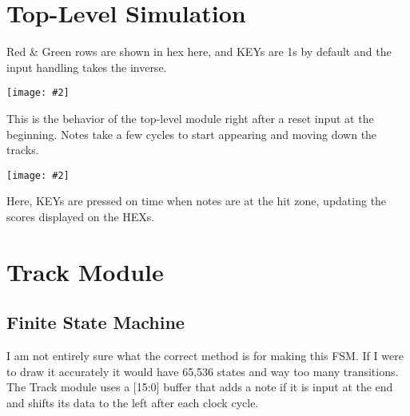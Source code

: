\documentclass{article}
\newenvironment{solution}{\begin{mdframed}[style=SolutionFrame]}{\end{mdframed}}
\newcommand{\img}[2][1.0]{
    \begin{minipage}[t]{\linewidth}
        \begin{center}
            \texttt{[image: \#2]}
        \end{center}
    \end{minipage}
}
\begin{document}
\newpage
\section{Top-Level Simulation}
    \begin{solution}
        Red \& Green rows are shown in hex here, and KEYs are 1s by default and the input handling takes the inverse. \\
        \img{DDR_start_waves.png}
        This is the behavior of the top-level module right after a reset input at the beginning. Notes take a few cycles to start appearing and moving down the tracks. \\
        \img{DDR_end_waves.png}
        Here, KEYs are pressed on time when notes are at the hit zone, updating the scores displayed on the HEXs.
    \end{solution}

\newpage
\section{Track Module}
\subsection{Finite State Machine}
    \begin{solution}
        \begin{center}
        \end{center}
        I am not entirely sure what the correct method is for making this FSM. If I were to draw it accurately it would have 65,536 states and way too many transitions. The Track module uses a [15:0] buffer that adds a note if it is input at the end and shifts its data to the left after each clock cycle.
    \end{solution}
\end{document}
